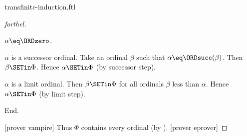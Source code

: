 \documentclass{naproche-library}
\begin{document}
\begin{smodule}[title=Transfinite Induction]{transfinite-induction.ftl}
\begin{proof}[forthel]
    \begin{case}{$\alpha \eq \ORDzero$.} \end{case}

    \begin{case}{$\alpha$ is a successor ordinal.}
      Take an ordinal $\beta$ such that $\alpha \eq \ORDsucc(\beta)$.
      Then $\beta \SETin \Phi$.
      Hence $\alpha \SETin \Phi$ (by successor step).
    \end{case}

    \begin{case}{$\alpha$ is a limit ordinal.}
      Then $\beta \SETin \Phi$ for all ordinals $\beta$ less than $\alpha$.
      Hence $\alpha \SETin \Phi$ (by limit step).
    \end{case}
  End.

  [prover vampire]
  Thus $\Phi$ contains every ordinal (by ).
  [prover eprover]
\end{proof}
\end{smodule}
\end{document}
